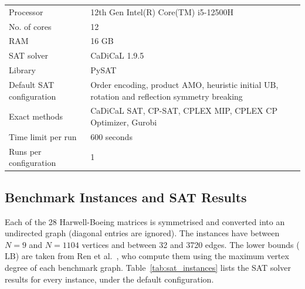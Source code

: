 \documentclass[a4paper,fleqn]{cas-sc}
\begin{document}
        \begin{center}
        \centering
        \label{tab:specs}
        \begin{tabular}{lp{}}
        \toprule
        Processor & 12th Gen Intel(R) Core(TM) i5-12500H \\
        No. of cores & 12 \\
        RAM & 16 GB \\
        SAT solver & CaDiCaL 1.9.5 \\
        Library & PySAT \\
        Default SAT configuration & Order encoding, product AMO, heuristic initial $\text{UB}$, rotation and reflection symmetry breaking \\
        Exact methods & CaDiCaL SAT, CP-SAT, CPLEX MIP, CPLEX CP Optimizer, Gurobi \\
        Time limit per run & 600 seconds \\
        Runs per configuration & 1 \\
        \bottomrule
        \end{tabular}
        \end{center}

    \subsection{Benchmark Instances and SAT Results}

        Each of the 28 Harwell-Boeing matrices is symmetrised and converted into an undirected graph (diagonal entries are ignored). The instances have between $N=9$ and $N=1104$ vertices and between 32 and 3720 edges. The lower bounds ($\text{LB}$) are taken from Ren et al.~\cite{Ren2020}, who compute them using the maximum vertex degree of each benchmark graph. Table~\ref{tab:sat_instances} lists the SAT solver results for every instance, under the default configuration.
\end{document}
